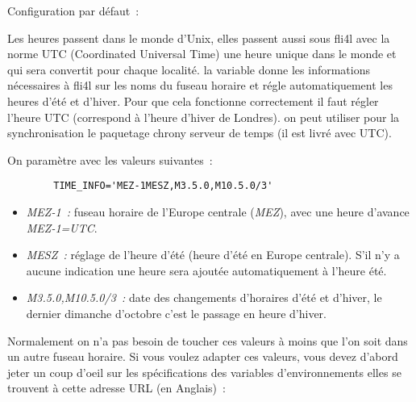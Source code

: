 \begin{description}

  Configuration par défaut~: 

  Les heures passent dans le monde d'Unix, elles passent aussi sous fli4l
  avec la norme UTC (Coordinated Universal Time) une heure unique dans le
  monde et qui sera convertit pour chaque localité. la variable 
  donne les informations nécessaires à fli4l sur les noms du fuseau
  horaire et régle automatiquement les heures d'été et d'hiver. Pour que cela
  fonctionne correctement il faut régler l'heure UTC (correspond à l'heure
  d'hiver de Londres). on peut utiliser pour la synchronisation le paquetage
  chrony serveur de temps (il est livré avec UTC).

  On paramètre  avec les valeurs suivantes~:
\begin{example}
\begin{verbatim}
        TIME_INFO='MEZ-1MESZ,M3.5.0,M10.5.0/3'
\end{verbatim}
\end{example}
  \begin{itemize}
  \item \emph{MEZ-1~:} fuseau horaire de l'Europe centrale (\emph{MEZ}),
    avec une heure d'avance \emph{MEZ-1=UTC}.
  \item \emph{MESZ~:} réglage de l'heure d'été (heure d'été en Europe
    centrale). S'il n'y a aucune indication une heure sera ajoutée automatiquement
    à l'heure été.
  \item \emph{M3.5.0,M10.5.0/3~:} date des changements d'horaires d'été et
  d'hiver, le dernier dimanche d'octobre c'est le passage en heure d'hiver.
  \end{itemize}

  Normalement on n'a pas besoin de toucher ces valeurs à moins que l'on
  soit dans un autre fuseau horaire. Si vous voulez adapter ces valeurs, vous devez
  d'abord jeter un coup d'oeil sur les spécifications des variables d'environnements
  elles se trouvent à cette adresse URL (en Anglais)~:

\end{description}
